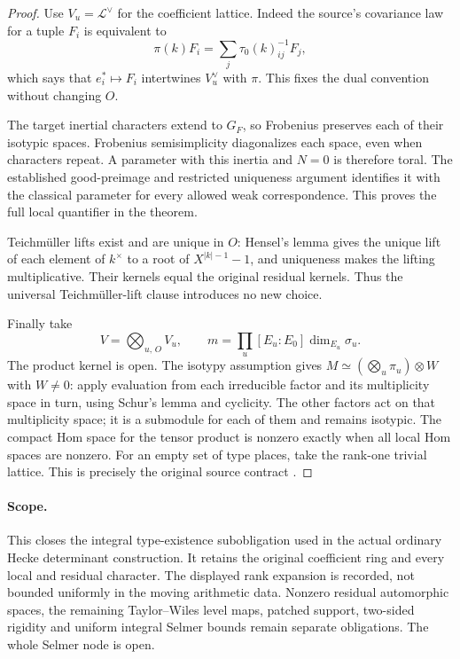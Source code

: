 \begin{proof}
Use \(V_u=\mathcal L^\vee\) for the coefficient lattice.
Indeed the source's covariance law for a tuple \(F_i\) is equivalent to
\[
                    \pi(k)F_i
                        =\sum_j\tau_0(k)^{-1}_{ij}F_j,
\]
which says that \(e_i^*\mapsto F_i\) intertwines \(V_u^\vee\) with
\(\pi\). This fixes the dual convention without changing \(O\).

The target inertial characters extend to \(G_F\), so Frobenius preserves
each of their isotypic spaces. Frobenius semisimplicity diagonalizes each
space, even when characters repeat. A parameter with this inertia and
\(N=0\) is therefore toral. The established good-preimage and restricted
uniqueness argument identifies it with the classical parameter for every
allowed weak correspondence. This proves the full local quantifier in
the theorem.

Teichm\"uller lifts exist and are unique in \(O\): Hensel's lemma gives
the unique lift of each element of \(k^\times\) to a root of
\(X^{|k|-1}-1\), and uniqueness makes the lifting multiplicative.
Their kernels equal the original residual kernels. Thus the
universal Teichm\"uller-lift clause introduces no new choice.

Finally take
\[
 V=\bigotimes_{u,\,O}V_u,\qquad
 m=\prod_u [E_u:E_0]\dim_{E_u}\sigma_u.
\]
The product kernel is open. The isotypy assumption gives
\(M\simeq(\bigotimes_u\pi_u)\otimes W\) with \(W\ne0\):
apply evaluation from each irreducible factor and its multiplicity
space in turn, using Schur's lemma and cyclicity. The other factors act
on that multiplicity space; it is a submodule for each of them and
remains isotypic. The compact Hom space for the tensor product is
nonzero exactly when all local Hom spaces are nonzero.
For an empty set of type places, take the rank-one trivial lattice.
This is precisely the original source contract
\cite{SelmerTypeSource}.
\end{proof}

\paragraph{Scope.}
This closes the integral type-existence subobligation used in the actual
ordinary Hecke determinant construction. It retains the original
coefficient ring and every local and residual character.
The displayed rank expansion is recorded, not bounded uniformly in
the moving arithmetic data.
Nonzero residual automorphic spaces, the remaining Taylor--Wiles level
maps, patched support, two-sided rigidity and uniform integral Selmer
bounds remain separate obligations. The whole Selmer node is open.
